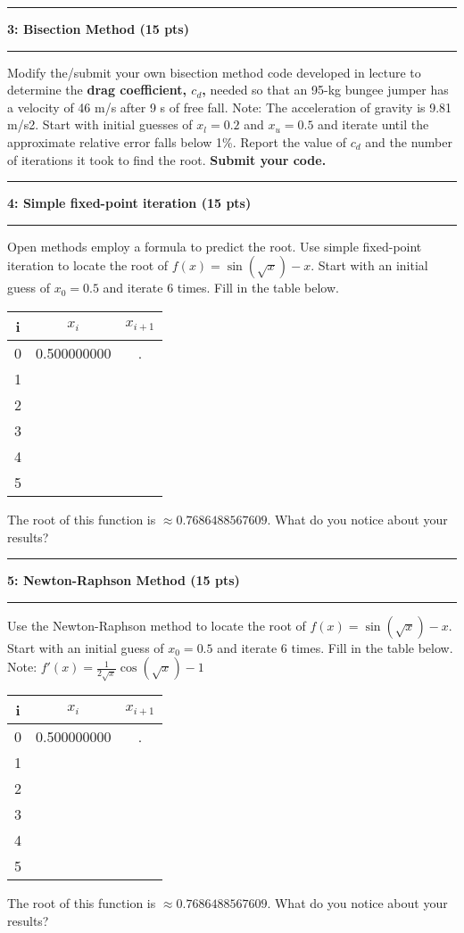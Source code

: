 \documentclass[11pt]{article}
\newcommand\question[2]{\vspace{.25in}\hrule\textbf{#1: #2}\vspace{.5em}\hrule\vspace{.10in}}
\begin{document}
\question{3}{Bisection Method (15 pts)}
Modify the/submit your own bisection method code developed in lecture to determine the \textbf{drag coefficient, $c_d$,} needed so that an 95-kg bungee jumper has a velocity of 46 m/s after
9 s of free fall. Note: The acceleration of gravity is 9.81 m/s2.
Start with initial guesses of $x_l = 0.2$ and $x_u = 0.5$ and iterate
until the approximate relative error falls below 1\%. Report the value of $c_d$ and the number of iterations it took to find the root. \textbf{Submit your code.}

\newpage
\question{4}{Simple fixed-point iteration (15 pts)}
Open methods employ a formula to predict the root. Use simple fixed-point iteration to locate the root of $f(x)=\sin(\sqrt{x})-x$. Start with an initial guess of $x_0=0.5$ and iterate 6 times. Fill in the table below. 
\begin{table}[H]
	\centering
	\begin{tabular}{c | c | c}
		i & $x_i$ & $x_{i+1}$ \\
		\hline
		0 & 0.500000000 &  \qquad \qquad \qquad \qquad.\\ 
		\hline
		1 &  & \\
		\hline
		2 &	 & \\ 
		\hline
		3 &  & \\
		\hline
		4 &  & \\
 		\hline
 		5 &  & \\
	\end{tabular}
\end{table}
The root of this function is $\approx 0.7686488567609$. What do you notice about your results?\\
\vspace{4cm}



\question{5}{Newton-Raphson Method (15 pts)}
 Use the Newton-Raphson method to locate the root of $f(x)=\sin(\sqrt{x})-x$. Start with an initial guess of $x_0=0.5$ and iterate 6 times. Fill in the table below. Note: $f'(x) = \frac{1}{2\sqrt{x}}\cos(\sqrt{x}) -1$
\begin{table}[H]
	\centering
	\begin{tabular}{c | c | c}
		i & $x_i$ & $x_{i+1}$ \\
		\hline
		0 & 0.500000000 &  \qquad \qquad \qquad \qquad.\\ 
		\hline
		1 &  & \\
		\hline
		2 &	 & \\ 
		\hline
		3 &  & \\
		\hline
		4 &  & \\
		\hline
		5 &  & \\
	\end{tabular}
\end{table}
The root of this function is $\approx 0.7686488567609$. What do you notice about your results?\\
\end{document}
